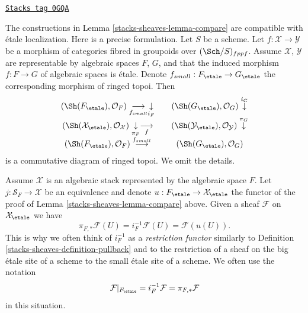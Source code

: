 \begin{remark}[Compare]
\label{stacks-sheaves-remark-compare}
\href{https://stacks.math.columbia.edu/tag/0GQA}{\texttt{Stacks tag 0GQA}}

The constructions in Lemma \ref{stacks-sheaves-lemma-compare} are compatible with \'etale
localization. Here is a precise formulation. Let $S$ be a scheme.
Let $f : \mathcal{X} \to \mathcal{Y}$ be a morphism
of categories fibred in groupoids over $(\Sch/S)_{fppf}$. Assume
$\mathcal{X}$, $\mathcal{Y}$ are representable by algebraic spaces $F$, $G$,
and that the induced morphism $f : F \to G$ of algebraic spaces is \'etale.
Denote $f_{small} : F_\etale \to G_\etale$
the corresponding morphism of ringed topoi. Then
$$
\begin{array}{ccc}(\Sh(F_\etale), \mathcal{O}_F) \underset{f_{small}}{\longrightarrow}\underset{i_F}{\downarrow} &  & (\Sh(G_\etale), \mathcal{O}_G) \overset{i_G}{\downarrow} \\ (\Sh(\mathcal{X}_\etale), \mathcal{O}_\mathcal{X})
\underset{\pi_F}{\downarrow}\underset{f}{\longrightarrow} &  & (\Sh(\mathcal{Y}_\etale), \mathcal{O}_\mathcal{Y}) \overset{\pi_G}{\downarrow} \\ (\Sh(F_\etale), \mathcal{O}_F) \overset{f_{small}}{\longrightarrow} &  & (\Sh(G_\etale), \mathcal{O}_G)\end{array}
$$
is a commutative diagram of ringed topoi. We omit the details.
\end{remark}

Assume $\mathcal{X}$ is an algebraic stack represented by the
algebraic space $F$.
Let $j : \mathcal{S}_F \to \mathcal{X}$ be an equivalence and denote
$u : F_\etale \to \mathcal{X}_\etale$ the
functor of the proof of Lemma \ref{stacks-sheaves-lemma-compare} above.
Given a sheaf $\mathcal{F}$ on $\mathcal{X}_\etale$ we have
$$
\pi_{F, *}\mathcal{F}(U) = i_F^{-1}\mathcal{F}(U) = \mathcal{F}(u(U)).
$$
This is why we often think of $i_F^{-1}$ as a {\it restriction functor}
similarly to
Definition \ref{stacks-sheaves-definition-pullback}
and to the restriction of a sheaf on the big \'etale site of
a scheme to the small \'etale site of a scheme. We often use the notation
\begin{equation}
\label{equation-restrict}
\mathcal{F}|_{F_\etale} = i_F^{-1}\mathcal{F} = \pi_{F, *}\mathcal{F}
\end{equation}
in this situation.

